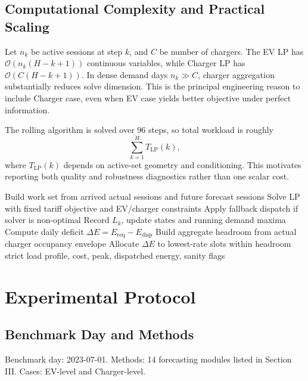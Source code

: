 \documentclass[journal]{IEEEtran}
\begin{document}
\subsection{Computational Complexity and Practical Scaling}
Let $n_k$ be active sessions at step $k$, and $C$ be number of chargers. The EV LP has $\mathcal{O}(n_k(H-k+1))$ continuous variables, while Charger LP has $\mathcal{O}(C(H-k+1))$. In dense demand days $n_k\gg C$, charger aggregation substantially reduces solve dimension. This is the principal engineering reason to include Charger case, even when EV case yields better objective under perfect information.

The rolling algorithm is solved over 96 steps, so total workload is roughly
\begin{equation}
\sum_{k=1}^{H} T_{\mathrm{LP}}(k),
\end{equation}
where $T_{\mathrm{LP}}(k)$ depends on active-set geometry and conditioning. This motivates reporting both quality and robustness diagnostics rather than one scalar cost.

\begin{algorithm}[t]
\caption{Rolling MPC With Strict Charger Reconciliation}
\begin{algorithmic}[1]
    \State Build work set from arrived actual sessions and future forecast sessions
    \State Solve LP with fixed tariff objective and EV/charger constraints
    \State Apply fallback dispatch if solver is non-optimal
    \State Record $L_k$, update states and running demand maxima
\EndFor
{}
    \State Compute daily deficit $\Delta E=E_{\mathrm{req}}-E_{\mathrm{disp}}$
    \State Build aggregate headroom from actual charger occupancy envelope
    \State Allocate $\Delta E$ to lowest-rate slots within headroom
\EndIf
\State \Return strict load profile, cost, peak, dispatched energy, sanity flags
\end{algorithmic}
\end{algorithm}

\section{Experimental Protocol}

\subsection{Benchmark Day and Methods}
Benchmark day: 2023-07-01.
Methods: 14 forecasting modules listed in Section III.
Cases: EV-level and Charger-level.
\end{document}

